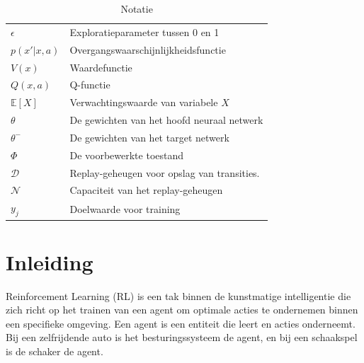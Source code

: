 \documentclass[a4paper,11pt]{report}
\begin{document}
\begin{table}[h]
\begin{tabular}{>{\raggedright}p{2.5cm} >{\raggedright\arraybackslash}p{10cm}}
        $\epsilon$               & Exploratieparameter tussen 0 en 1           \\
        $p(x'|x, a)$             & Overgangswaarschijnlijkheidsfunctie         \\
        $V(x)$                   & Waardefunctie                               \\
        $Q(x, a)$                & Q-functie                                   \\
        $\mathbb{E}[X]$          & Verwachtingswaarde van variabele $X$        \\
        $\theta$                 & De gewichten van het hoofd neuraal netwerk  \\
        $\theta^-$               & De gewichten van het target netwerk         \\
        $\Phi$                   & De voorbewerkte toestand                    \\
        $\mathcal{D}$            & Replay-geheugen voor opslag van transities. \\
        $\mathcal{N}$            & Capaciteit van het replay-geheugen          \\
        $y_j$                    & Doelwaarde voor training                    \\

    \end{tabular}
    \caption{Notatie}
\end{table}

\newpage

\chapter{Inleiding}
Reinforcement Learning (RL) is een tak binnen de kunstmatige intelligentie die
zich richt op het trainen van een agent om optimale acties te ondernemen binnen
een specifieke omgeving. Een agent is een entiteit die leert en acties
onderneemt. Bij een zelfrijdende auto is het besturingssysteem de agent, en bij
een schaakspel is de schaker de agent.
\end{document}
